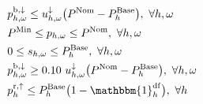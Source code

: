 {\begin{subequations}
\begin{align}
        \                                                                                             & p^{\rm{b}, \downarrow}_{h,\omega} \leq u^{\downarrow}_{h,\omega} \big(P^{\rm{Nom}} -P^{\rm{Base}}_{h}\big), \                                                                                              \forall{h,\omega}                                                                             \label{power:10}                                                        \\
        \                                                                                             & P^{\rm{Min}} \leq p_{h,\omega} \leq P^{\rm{Nom}}, \                                                                                                                                           \forall{h,\omega}                                                                             \label{power:11}                                                        \\
        \                                                                                             & 0 \leq s_{h,\omega} \leq P^{\rm{Base}}_{h}, \                                                                                                                                                   \forall{h,\omega}                                                                             \label{power:12}                                                        \\
        \                                                                                             & p^{\rm{b}, \downarrow}_{h,\omega} \geq 0.10 \  u^{\downarrow}_{h,\omega} \big(P^{\rm{Nom}} - P^{\rm{Base}}_{h}\big), \                                                                                  \forall{h,\omega}                                                                             \label{power:14}                                                        \\
        \                                                                                             & p^{\rm{r}, \uparrow}_{h} \leq P^{\rm{Base}}_{h} \big(1 - \mathbbm{1}_{h}^{\rm{df}}\big), \                                                                                                                 \forall{h} \label{power:15}                                                                                                                                           \\

\end{align}
\end{subequations}}
